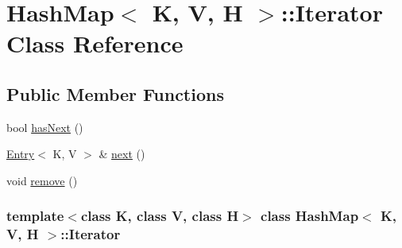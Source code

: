 \hypertarget{class_hash_map_1_1_iterator}{
\section{HashMap$<$ K, V, H $>$::Iterator Class Reference}
\label{class_hash_map_1_1_iterator}
}
\subsection*{Public Member Functions}
\begin{DoxyCompactItemize}
\item 
bool \hyperlink{class_hash_map_1_1_iterator_a5e7786cabee60410293e51b666301a07}{hasNext} ()
\item 
\hyperlink{class_entry}{Entry}$<$ K, V $>$ \& \hyperlink{class_hash_map_1_1_iterator_aab7df63f7b13a229e0dccc71d2123b21}{next} ()
\item 
void \hyperlink{class_hash_map_1_1_iterator_af0f58ac5800876fddce601e5c6e6dd11}{remove} ()
\end{DoxyCompactItemize}
\subsubsection*{template$<$class K, class V, class H$>$ class HashMap$<$ K, V, H $>$::Iterator}



